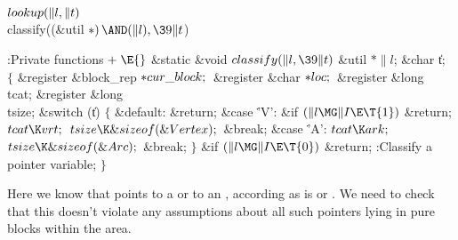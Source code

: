 \Y\B\4\D$\\{lookup}(\|l,\|t)$ \5
\\{classify}((\&{util} ${}{*})\,{\AND}(\|l),\39\|t{}$)\par
\Y\B\4:Private functions\X${}\mathrel+\E{}$\6
\1\1\&{static} \&{void} ${}\\{classify}(\|l,\39\|t){}$\6
\&{util} ${}{*}\|l{}$;\6
\&{char} \|t;\2\2\6
${}\{{}$\5
\1\&{register} \&{block\_rep} ${}{*}\\{cur\_block};{}$\6
\&{register} \&{char} ${}{*}\\{loc};{}$\6
\&{register} \&{long} \\{tcat};\6
\&{register} \&{long} \\{tsize};\7
\&{switch} (\|t)\5
${}\{{}$\1\6
\4\&{default}:\5
\&{return};\6
\4\&{case} \.{'V'}:\6
\&{if} ${}(\|l\MG\|I\E\T{1}){}$\1\5
\&{return};\2\6
${}\\{tcat}\K\\{vrt};{}$\6
${}\\{tsize}\K\&{sizeof}(\&{Vertex});{}$\6
\&{break};\6
\4\&{case} \.{'A'}:\5
${}\\{tcat}\K\\{ark};{}$\6
${}\\{tsize}\K\&{sizeof}(\&{Arc});{}$\6
\&{break};\6
\4${}\}{}$\2\6
\&{if} ${}(\|l\MG\|I\E\T{0}){}$\1\5
\&{return};\2\6
:Classify a pointer variable\X;\6
\4${}\}{}$\2\par
\fi

Here we know that  points to a  or
to an , according as  is  or .
We need to check that
this doesn't violate any assumptions about all such pointers lying
in pure blocks within the  area.

